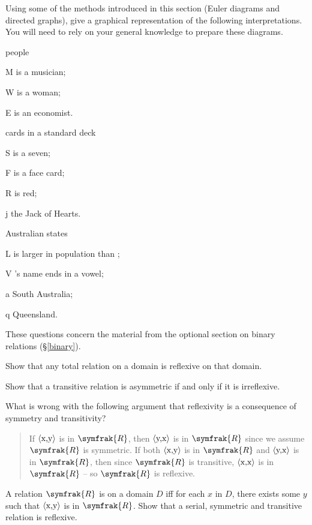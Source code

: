 \problempart
Using some of the methods introduced in this section (Euler diagrams and directed graphs), give a graphical representation of the following interpretations. You will need to rely on your general knowledge to prepare these diagrams. \begin{earg}
	\item \begin{ekey}
		\item[\domain] people
		\item[M]  is a musician;
		\item[W]  is a woman;
		\item[E]  is an economist.
	\end{ekey}
	\item \begin{ekey}
\item[\domain] cards in a standard deck
\item[S]  is a seven;
\item[F]  is a face card;
\item[R]  is red;
\item[j] the Jack of Hearts.
	\end{ekey}
	\item \begin{ekey}
		\item[\domain] Australian states
		\item[L]  is larger in population than \gap{2};
		\item[V] 's name ends in a vowel;
		\item[a] South Australia;
		\item[q] Queensland.
	\end{ekey}
\end{earg}

\problempart These questions concern the material from the optional section on binary relations (§\ref{binary}). \begin{earg} \item Show that any total relation on a domain is reflexive on that domain.
\item Show that a transitive relation is asymmetric if and only if it is irreflexive.
\item What is wrong with the following argument that reflexivity is a consequence of symmetry and transitivity? \begin{quote}
	If $\mbox{\ensuremath{\mathopen{\langle}}x,y\ensuremath{\mathclose{\rangle}}}$ is in $\symfrak{R}$, then $\mbox{\ensuremath{\mathopen{\langle}}y,x\ensuremath{\mathclose{\rangle}}}$ is in $\symfrak{R}$ since we assume $\symfrak{R}$ is symmetric. If both $\mbox{\ensuremath{\mathopen{\langle}}x,y\ensuremath{\mathclose{\rangle}}}$ is in $\symfrak{R}$ and $\mbox{\ensuremath{\mathopen{\langle}}y,x\ensuremath{\mathclose{\rangle}}}$ is in $\symfrak{R}$, then since $\symfrak{R}$ is transitive, $\mbox{\ensuremath{\mathopen{\langle}}x,x\ensuremath{\mathclose{\rangle}}}$ is in $\symfrak{R}$ – so $\symfrak{R}$ is reflexive. 
\end{quote}
\item A relation $\symfrak{R}$ is  on a domain $D$ iff for each $x$ in $D$, there exists some $y$ such that $\mbox{\ensuremath{\mathopen{\langle}}x,y\ensuremath{\mathclose{\rangle}}}$ is in $\symfrak{R}$.  Show that a serial, symmetric and transitive relation is reflexive. 
\end{earg}


